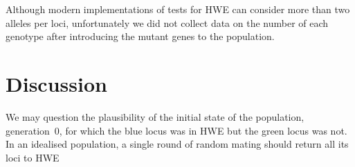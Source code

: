 \documentclass{article}
\begin{document}
    Although modern implementations of tests for \ac{HWE} can consider more
        than two alleles per loci, unfortunately we did not collect data on the
        number of each genotype after introducing the mutant genes to the
        population.

    \section*{Discussion}

        We may question the plausibility of the initial state of the
            population, generation~0, for which the blue locus was in
            \ac{HWE} but the green locus was not.
        In an idealised population, a single round of random mating should
            return all its loci to \ac{HWE}

    \printbibliography
\end{document}
